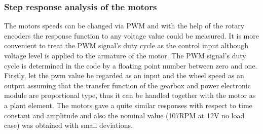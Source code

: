 \documentclass[12pt,english]{article}
\begin{document}
\subsubsection{Step response analysis of the motors}
The motors speeds can be changed via PWM and with the help of the rotary encoders the response function to any voltage value could be measured. It is more convenient to treat the PWM signal's duty cycle as the control input although voltage level is applied to the armature of the motor. The PWM signal's duty cycle is determined in the code by a floating point number between zero and one. Firstly, let the pwm value be regarded as an input and the wheel speed as an output assuming that the transfer function of the gearbox and power electronic module are proportional type, thus it can be handled together with the motor as a plant element. 
The motors gave a quite similar responses with respect to time constant and amplitude and also the nominal value (107RPM at 12V no load case) was obtained with small deviations. 
\end{document}
